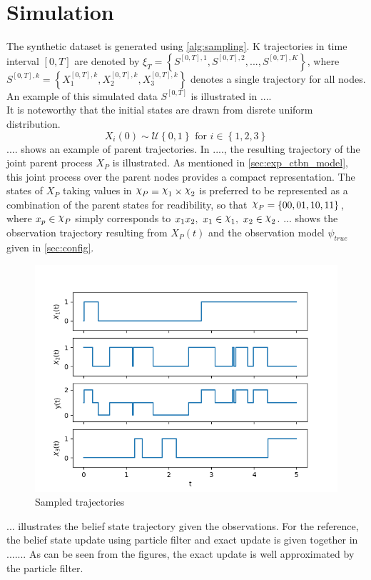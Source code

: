 \section{Simulation}
The synthetic dataset is generated using \cref{alg:sampling}. K trajectories in time interval $ [0, T] $ are denoted by $ \xi_T = \left\lbrace S^{[0,T], 1}, S^{[0,T], 2}, ..., S^{[0,T], K} \right\rbrace  $, where $ S^{[0,T],k} = \left\lbrace X_1^{[0,T],k} , X_2^{[0,T],k}, X_3^{[0,T],k}\right\rbrace $ denotes a single trajectory for all nodes. An example of this simulated data $ S^{[0,T]} $ is illustrated in .... \\%
It is noteworthy that the initial states are drawn from disrete uniform distribution.
\begin{equation}
X_i(0) \sim \mathcal{U} \left\lbrace 0, 1\right\rbrace  \text{ for } i \in \left\lbrace 1,2,3\right\rbrace 
\end{equation}
.... shows an example of parent trajectories. In ...., the resulting trajectory of the joint parent process $ X_P $ is illustrated. As mentioned in \cref{sec:exp_ctbn_model}, this joint process over the parent nodes provides a compact representation. The states of $ X_P $ taking values in $ \rchi_P = \rchi_1 \times \rchi_2 $ is preferred to be represented as a combination of the parent states for readibility, so that $ \rchi_P = \left\lbrace 00, 01, 10, 11\right\rbrace  $, where $ x_p \in \rchi_P $ simply corresponds to $ x_1x_2,\ x_1\in \rchi_1,\  x_2\in \rchi_2 $. ... shows the observation trajectory resulting from $ X_P(t) $ and the observation model $ \psi_{true} $ given in \cref{sec:config}.
\begin{figure}[H]
	\begin{center}
		\includegraphics[width=.60\textwidth]{figures/traj}
		\caption{Sampled trajectories}
		\label{fig:simulation}
	\end{center}
\end{figure}
... illustrates the belief state trajectory given the observations. For the reference, the belief state update using particle filter and exact update is given together in ....... As can be seen from the figures, the exact update is well approximated by the particle filter.
